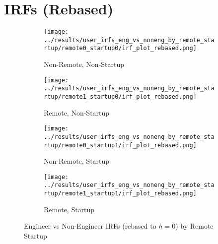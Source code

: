 \documentclass[11pt]{article}
\begin{document}
\section*{IRFs (Rebased)}
\begin{figure}[H]
  \centering
  \begin{subfigure}[t]{0.48\linewidth}
    \centering
    \texttt{[image: ../results/user\_irfs\_eng\_vs\_noneng\_by\_remote\_startup/remote0\_startup0/irf\_plot\_rebased.png]}
    \caption{Non-Remote, Non-Startup}
  \end{subfigure}\hfill
  \begin{subfigure}[t]{0.48\linewidth}
    \centering
    \texttt{[image: ../results/user\_irfs\_eng\_vs\_noneng\_by\_remote\_startup/remote1\_startup0/irf\_plot\_rebased.png]}
    \caption{Remote, Non-Startup}
  \end{subfigure}

  \begin{subfigure}[t]{0.48\linewidth}
    \centering
    \texttt{[image: ../results/user\_irfs\_eng\_vs\_noneng\_by\_remote\_startup/remote0\_startup1/irf\_plot\_rebased.png]}
    \caption{Non-Remote, Startup}
  \end{subfigure}\hfill
  \begin{subfigure}[t]{0.48\linewidth}
    \centering
    \texttt{[image: ../results/user\_irfs\_eng\_vs\_noneng\_by\_remote\_startup/remote1\_startup1/irf\_plot\_rebased.png]}
    \caption{Remote, Startup}
  \end{subfigure}
  \caption{Engineer vs Non-Engineer IRFs (rebased to $h{=}0$) by Remote\,\texttimes\,Startup}
\end{figure}
\end{document}
